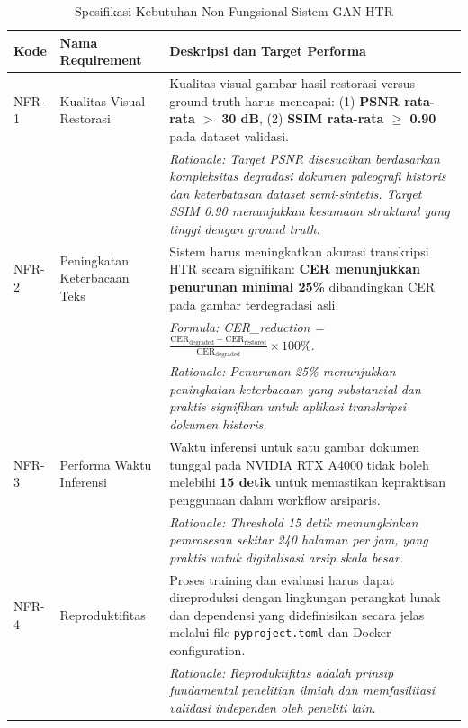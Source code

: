 \begin{table}[htbp!]
\centering
\small
\caption{Spesifikasi Kebutuhan Non-Fungsional Sistem GAN-HTR}
\label{tab:non_functional_requirements}
\begin{tabular}{p{}p{}p{}}
\toprule
\textbf{Kode} & \textbf{Nama Requirement} & \textbf{Deskripsi dan Target Performa} \\
\midrule
NFR-1 & Kualitas Visual Restorasi & Kualitas visual gambar hasil restorasi versus ground truth harus mencapai: (1) \textbf{PSNR rata-rata $>$ 30 dB}, (2) \textbf{SSIM rata-rata $\geq$ 0.90} pada dataset validasi. \\[0.3em]
   & & \textit{Rationale: Target PSNR disesuaikan berdasarkan kompleksitas degradasi dokumen paleografi historis dan keterbatasan dataset semi-sintetis. Target SSIM 0.90 menunjukkan kesamaan struktural yang tinggi dengan ground truth.} \\
\midrule
NFR-2 & Peningkatan Keterbacaan Teks & Sistem harus meningkatkan akurasi transkripsi HTR secara signifikan: \textbf{CER menunjukkan penurunan minimal 25\%} dibandingkan CER pada gambar terdegradasi asli. \\[0.3em]
   & & \textit{Formula: CER\_reduction = $\frac{\text{CER}_{\text{degraded}} - \text{CER}_{\text{restored}}}{\text{CER}_{\text{degraded}}} \times 100\%$}. \\[0.3em]
   & & \textit{Rationale: Penurunan 25\% menunjukkan peningkatan keterbacaan yang substansial dan praktis signifikan untuk aplikasi transkripsi dokumen historis.} \\
\midrule
NFR-3 & Performa Waktu Inferensi & Waktu inferensi untuk satu gambar dokumen tunggal pada NVIDIA RTX A4000 tidak boleh melebihi \textbf{15 detik} untuk memastikan kepraktisan penggunaan dalam workflow arsiparis. \\[0.3em]
   & & \textit{Rationale: Threshold 15 detik memungkinkan pemrosesan sekitar 240 halaman per jam, yang praktis untuk digitalisasi arsip skala besar.} \\
\midrule
NFR-4 & Reproduktifitas & Proses training dan evaluasi harus dapat direproduksi dengan lingkungan perangkat lunak dan dependensi yang didefinisikan secara jelas melalui file \texttt{pyproject.toml} dan Docker configuration. \\[0.3em]
   & & \textit{Rationale: Reproduktifitas adalah prinsip fundamental penelitian ilmiah dan memfasilitasi validasi independen oleh peneliti lain.} \\
\bottomrule
\end{tabular}
\end{table}

